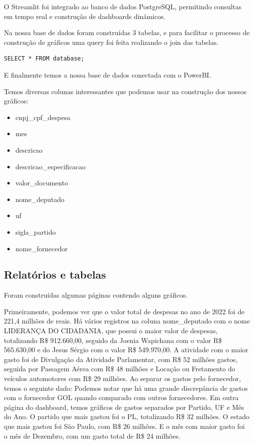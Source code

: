 \documentclass[12pt, a4paper]{article}
\begin{document}
O Streamlit foi integrado ao banco de dados PostgreSQL, permitindo consultas em tempo real e construção de dashboards dinâmicos.

Na nossa base de dados foram construídas 3 tabelas, e para facilitar o processo de construção de gráficos uma query foi feita realizando o join das tabelas.

\begin{verbatim}
SELECT * FROM database;
\end{verbatim}

E finalmente temos a nossa base de dados conectada com o PowerBI.

Temos diversas colunas interessantes que podemos usar na construção dos nossos gráficos:
\begin{itemize}	
	\item cnpj\_cpf\_despesa
	\item mes
	\item descricao
	\item descricao\_especificacao
	\item valor\_documento
	\item nome\_deputado
	\item uf
	\item sigla\_partido
	\item nome\_fornecedor
\end{itemize}

\subsection{Relatórios e tabelas}

Foram construídas algumas páginas contendo alguns gráficos.

Primeiramente, podemos ver que o valor total de despesas no ano de 2022 foi de 221,4 milhões de reais.
Há vários registros na coluna nome\_deputado com o nome LIDERANÇA DO CIDADANIA, que possui o maior valor de despesas, totalizando R\$ 912.660,00, seguido da Joenia Wapichana com o valor R\$ 565.630,00 e do Jesus Sérgio com o valor R\$ 549.970,00.
A atividade com o maior gasto foi de Divulgação da Atividade Parlamentar, com R\$ 52 milhões gastos, seguida por Passagem Aérea com R\$ 48 milhões e Locação ou Fretamento do veículos automotores com R\$ 29 milhões.
Ao separar os gastos pelo fornecedor, temos o seguinte dado:
Podemos notar que há uma grande discrepância de gastos com o fornecedor GOL quando comparado com outros fornecedores.
Em outra página do dashboard, temos gráficos de gastos separados por Partido, UF e Mês do Ano.
O partido que mais gastou foi o PL, totalizando R\$ 32 milhões.
O estado que mais gastou foi São Paulo, com R\$ 26 milhões.
E o mês com maior gasto foi o mês de Dezembro, com um gasto total de R\$ 24 milhões.
\end{document}
